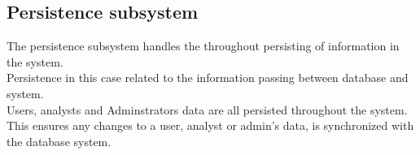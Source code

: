 \documentclass{article}
\begin{document}
		




		
		
		





	\pagebreak
	\subsection{Persistence subsystem}\label{subsec:Persistence}
	The persistence subsystem handles the throughout persisting of information in the system. \\Persistence in this case related to the information passing between database and system. \\ Users, analysts and Adminstrators data are all persisted throughout the system. \\ This ensures any changes to a user, analyst or admin's data, is synchronized with the database system.
\end{document}
